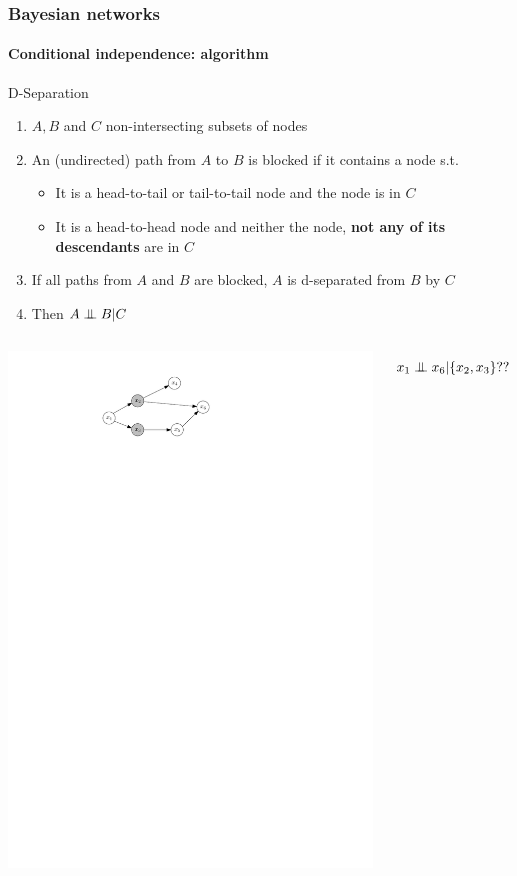 \documentclass[slidestop,compress,mathserif]{beamer}
\newcommand{\indep}{\ensuremath{\perp\mkern -10mu \perp}}
\begin{document}
\begin{frame}
	\frametitle{Bayesian networks}
	\framesubtitle{Conditional independence: algorithm}
    \vspace{-.5cm}
    \begin{block}{D-Separation}
    \begin{enumerate}
    \item $A,B$ and $C$ non-intersecting subsets of nodes
    \item An (undirected) path from $A$ to $B$ is blocked if it contains
    a node s.t.
    \begin{itemize}
    \item It is a head-to-tail or tail-to-tail node and
    the node is in $C$
    \item It is a head-to-head node and neither the node,
    \textbf{not any of its descendants} are in $C$
    \end{itemize}
    \item If all paths from $A$ and $B$ are blocked,
    $A$ is d-separated from $B$ by $C$
    \item Then $A \indep B | C$
    \end{enumerate}
    \end{block}
      \begin{columns}
    \column[c]{6cm}
    \begin{center}
    \includegraphics[width=.7\textwidth]{dsep2}
    \end{center}
    \column[c]{6cm}
    $$x_1\indep x_6|\{x_2,x_3\}??$$
    \end{columns}
   
\end{frame}
\end{document}
